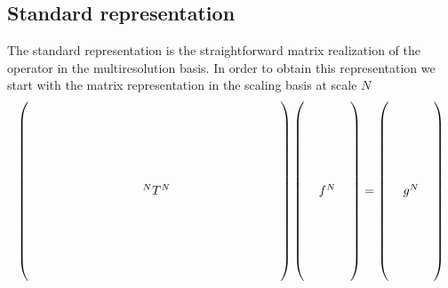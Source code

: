 \subsection{Standard representation}
The standard representation is the straightforward matrix realization of the operator 
in the multiresolution basis. In order to obtain this representation we start with the 
matrix representation in the scaling basis at scale $N$
\begin{equation}
\begin{split} 
    \label{eq:Tmatrix}
    \left(
    \begin{array}{c}
	$\multirow{12}{*}{$
	\ \ \ \ \ \  \ \ \ \ \ \ \ \ \ \ \ \ \ \ \ \ \ \ \ \ \T{N}{N}
	\ \ \ \ \ \ \ \ \ \ \ \ \ \ \ \ \ \ \ \ \ \ \ \ \ $}$
	\\ \\ \\ \\ \\ \\ \\ \\ \\ \\ \\ \\
    \end{array}
    \right) 
    \left(
    \begin{array}{c}
	$\multirow{12}{*}{$\ \ f^N\ \ $}$\\ \\ \\ \\ \\ \\ \\ \\ \\ \\ \\ \\
    \end{array}
    \right)
    = 
    \left(
    \begin{array}{c}
	$\multirow{12}{*}{$\ \ g^N\ \ $}$\\ \\ \\ \\ \\ \\ \\ \\ \\ \\ \\ \\
    \end{array}
    \right)
\end{split}
\end{equation}
